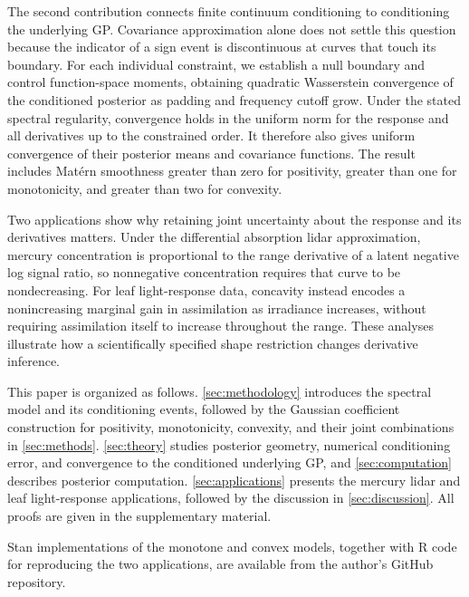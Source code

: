 The second contribution connects finite continuum conditioning to
conditioning the underlying GP. Covariance approximation alone does
not settle this question because the indicator of a sign event is
discontinuous at curves that touch its boundary. For each individual
constraint, we establish a null boundary and control function-space
moments, obtaining quadratic Wasserstein convergence of the
conditioned posterior as padding and frequency cutoff grow. Under
the stated spectral regularity, convergence holds in the uniform
norm for the response and all derivatives up to the constrained
order. It therefore also gives uniform convergence of their posterior
means and covariance functions. The result includes Mat\'ern
smoothness greater than zero for positivity, greater than one for
monotonicity, and greater than two for convexity.

Two applications show why retaining joint uncertainty about the
response and its derivatives matters. Under the differential
absorption lidar approximation, mercury concentration is proportional
to the range derivative of a latent negative log signal ratio, so
nonnegative concentration requires that curve to be nondecreasing.
For leaf light-response data, concavity instead encodes a nonincreasing
marginal gain in assimilation as irradiance increases, without
requiring assimilation itself to increase throughout the range.
These analyses illustrate how a scientifically specified shape
restriction changes derivative inference.

This paper is organized as follows. \cref{sec:methodology} introduces the
spectral model and its conditioning events, followed by the Gaussian
coefficient construction for positivity, monotonicity, convexity, and
their joint combinations in \cref{sec:methods}. \cref{sec:theory} studies
posterior geometry, numerical conditioning error, and convergence to the
conditioned underlying GP, and \cref{sec:computation} describes posterior
computation. \cref{sec:applications} presents the mercury lidar and leaf
light-response applications, followed by the discussion in
\cref{sec:discussion}.
\ifdefined\CombinedInlineProofs\else
All proofs are given in the supplementary material.
\fi

Stan implementations of the monotone and convex models, together with
R code for reproducing the two applications, are available from the
author's GitHub repository.
